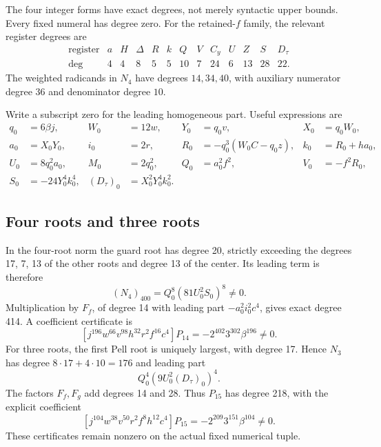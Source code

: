 The four integer forms have exact degrees, not merely syntactic upper
bounds. Every fixed numeral has degree zero. For the retained-$f$ family,
the relevant register degrees are
\[
\begin{array}{c|rrrrrrrrrrrr}
\text{register}&a&H&\Delta&R&k&Q&V&C_y&U&Z&S&D_\tau\\\hline
\deg&4&4&8&5&5&10&7&24&6&13&28&22.
\end{array}
\]
The weighted radicands in $N_4$ have degrees $14,34,40$, with auxiliary
numerator degree $36$ and denominator degree $10$.

Write a subscript zero for the leading homogeneous part. Useful expressions are
\begin{align*}
q_0&=6\beta j,&W_0&=12w,&Y_0&=q_0v,&X_0&=q_0W_0,\\
a_0&=X_0Y_0,&i_0&=2r,&R_0&=-q_0^3(W_0C-q_0z),&k_0&=R_0+ha_0,\\
U_0&=8q_0^2a_0,&M_0&=2q_0^2,&Q_0&=a_0^2f^2,&V_0&=-f^2R_0,\\
S_0&=-24Y_0^4k_0^4,&(D_\tau)_0&=X_0^2Y_0^4k_0^2.&&&
\end{align*}

\subsection{Four roots and three roots}
In the four-root norm the guard root has degree 20, strictly exceeding
the degrees 17, 7, 13 of the other roots and degree 13 of the center.
Its leading term is therefore
\[
 (N_4)_{400}=Q_0^8(81U_0^2S_0)^8\ne0.
\]
Multiplication by $F_f$, of degree 14 with leading part
$-a_0^2i_0^2c^4$, gives exact degree 414. A coefficient certificate is
\[
 [j^{196}w^{66}v^{98}h^{32}r^2f^{16}c^4]P_{14}
 =-2^{402}3^{302}\beta^{196}\ne0.
\]
For three roots, the first Pell root is uniquely largest, with degree 17.
Hence $N_3$ has degree $8\cdot17+4\cdot10=176$ and leading part
\[
 Q_0^4(9U_0^2(D_\tau)_0)^4.
\]
The factors $F_f,F_g$ add degrees 14 and 28. Thus $P_{15}$ has degree
218, with the explicit coefficient
\[
 [j^{104}w^{38}v^{50}r^2f^8h^{12}c^4]P_{15}
 =-2^{209}3^{151}\beta^{104}\ne0.
\]
These certificates remain nonzero on the actual fixed numerical tuple.

